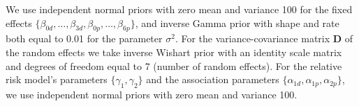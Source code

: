 We use independent normal priors with zero mean and variance 100 for the fixed effects ${\{\beta_{0d},\ldots,\beta_{3d}, \beta_{0p},\ldots,\beta_{6p}\}}$, and inverse Gamma prior with shape and rate both equal to 0.01 for the parameter $\sigma^2$. For the variance-covariance matrix $\boldsymbol{D}$ of the random effects we take inverse Wishart prior with an identity scale matrix and degrees of freedom equal to 7 (number of random effects). For the relative risk model's parameters $\{\gamma_1, \gamma_2\}$ and the association parameters $\{\alpha_{1d}, \alpha_{1p}, \alpha_{2p}\}$, we use independent normal priors with zero mean and variance 100.